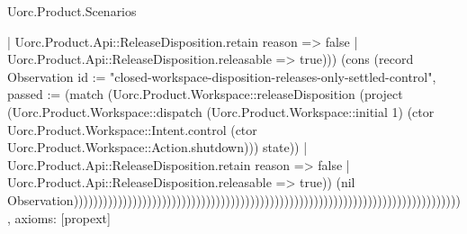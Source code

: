 \begin{lexlean}{Uorc.Product.Scenarios}
\begin{semanticmodule}
{{    | Uorc.Product.Api::ReleaseDisposition.retain reason => false
    | Uorc.Product.Api::ReleaseDisposition.releasable => true))}) (cons (record Observation {id := "closed-workspace-disposition-releases-only-settled-control", passed := (match (Uorc.Product.Workspace::releaseDisposition (project (Uorc.Product.Workspace::dispatch (Uorc.Product.Workspace::initial 1) (ctor Uorc.Product.Workspace::Intent.control (ctor Uorc.Product.Workspace::Action.shutdown))) state))
    | Uorc.Product.Api::ReleaseDisposition.retain reason => false
    | Uorc.Product.Api::ReleaseDisposition.releasable => true)}) (nil Observation))))))))))))))))))))))))))))))))))))))))))))))))))))))))))))))))))))))))))))))),
  axioms: [propext]
}
\end{semanticmodule}
\end{lexlean}
